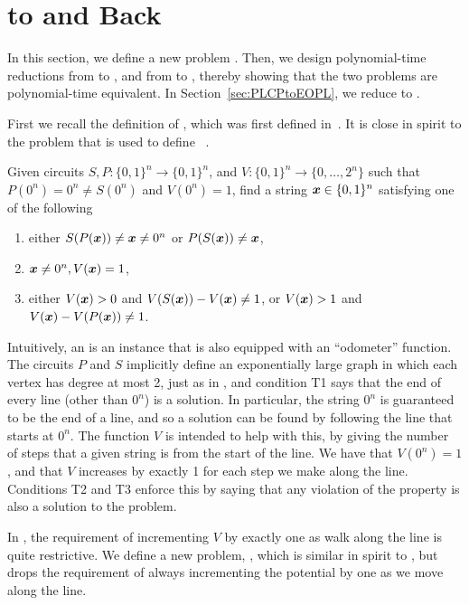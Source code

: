 \chapter{\EOML to \EOPL and Back}
\label{sec:EOMLtoEOPL}

In this section, we define a new problem \EOPL.
Then, we design polynomial-time reductions from \EOML to \EOPL, and
from \EOPL to \EOML, thereby showing that the two problems 
are polynomial-time equivalent. In Section~\ref{sec:PLCPtoEOPL},
we reduce \PLCP to \EOPL.

First we recall the definition of \EOML, which was
first defined in~\cite{hubavcek2017hardness}.
It is close in spirit to the problem \EOL that is used
to define \PPAD~\cite{papadimitriou1994complexity}. 

\begin{definition}
Given circuits $S,P: \{0,1\}^n \rightarrow \{0,1\}^n$, and $V:\{0,1\}^n\rightarrow \{0,\dots, 2^n\}$ such that $P(0^n) =0^n\neq S(0^n)$ and $V(0^n)=1$, find a string $\mbox{\boldmath $x$} \in \{0,1\}^n$ satisfying one of the following 
\begin{enumerate}[label=(T\arabic*)]
\item either $S(P(\mbox{\boldmath $x$}))\neq \mbox{\boldmath $x$} \neq 0^n$ or $P(S(\mbox{\boldmath $x$}))\neq \mbox{\boldmath $x$}$,
\item $\mbox{\boldmath $x$}\neq 0^n, V(\mbox{\boldmath $x$})=1$,
\item either $V(\mbox{\boldmath $x$})>0$ and $V(S(\mbox{\boldmath $x$}))-V(\mbox{\boldmath $x$})\neq 1$, or $V(\mbox{\boldmath $x$})>1$ and $V(\mbox{\boldmath $x$})-V(P(\mbox{\boldmath $x$}))\neq 1$. 
\end{enumerate}
\end{definition}
Intuitively, an \EOML is an \EOL instance that is also equipped with an
``odometer'' function. The circuits $P$ and $S$ implicitly define an
exponentially large graph in which each vertex has degree at most 2, just as in \EOL, and condition T1 says that the end of
every line (other than $0^n$) is a solution.
In particular, the string 
$0^n$ is guaranteed to be the end of a line, and so a solution can be found by
following the line that starts at $0^n$.
 The function $V$ is intended to help with this, by giving the number of steps
that a given string is from the start of the line. We have that $V(0^n) = 1$,
and that $V$ increases by exactly 1 for each step we make along the line.
Conditions T2 and T3 enforce this by saying that any violation of the property
is also a solution to the problem. 

In \EOML, the requirement of incrementing $V$ by exactly one as walk along the
line is quite restrictive. We define a new problem, \EOPL,  which is similar in
spirit to \EOL, but drops the requirement of always incrementing the potential
by one as we move along the line.

